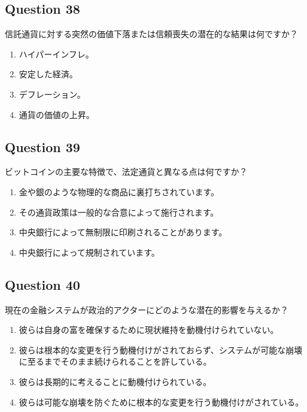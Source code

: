 \documentclass[12pt,a4paper]{article}
\begin{document}
\subsection*{Question 38}
信託通貨に対する突然の価値下落または信頼喪失の潜在的な結果は何ですか？

\begin{enumerate}[label=\Alph*., leftmargin=*]
\item ハイパーインフレ。
\item 安定した経済。
\item デフレーション。
\item 通貨の価値の上昇。
\end{enumerate}

\bigskip


\subsection*{Question 39}
ビットコインの主要な特徴で、法定通貨と異なる点は何ですか？

\begin{enumerate}[label=\Alph*., leftmargin=*]
\item 金や銀のような物理的な商品に裏打ちされています。
\item その通貨政策は一般的な合意によって施行されます。
\item 中央銀行によって無制限に印刷されることがあります。
\item 中央銀行によって規制されています。
\end{enumerate}

\bigskip


\subsection*{Question 40}
現在の金融システムが政治的アクターにどのような潜在的影響を与えるか？

\begin{enumerate}[label=\Alph*., leftmargin=*]
\item 彼らは自身の富を確保するために現状維持を動機付けられていない。
\item 彼らは根本的な変更を行う動機付けがされておらず、システムが可能な崩壊に至るまでそのまま続けられることを許している。
\item 彼らは長期的に考えることに動機付けられている。
\item 彼らは可能な崩壊を防ぐために根本的な変更を行う動機付けがされている。
\end{enumerate}
\end{document}
